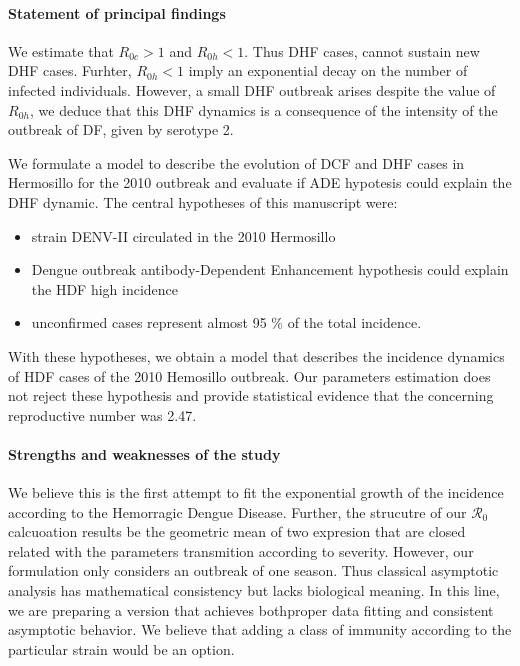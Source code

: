 \paragraph{Statement of principal findings}
    We estimate that $R_{0c}>1$ and  $R_{0h}<1$. Thus DHF cases, 
cannot sustain new DHF cases. Furhter, $R_{0h}<1$ imply an
exponential decay on the number of infected individuals. However,
a small DHF outbreak arises despite the value of $R_{0h}$, we deduce
that this DHF dynamics is a consequence of the
intensity of the outbreak of DF, given by serotype 2.

    We formulate a  model to describe the evolution of DCF and DHF
cases in Hermosillo for the 2010 outbreak and evaluate if ADE
hypotesis could explain the DHF dynamic. 
The central hypotheses of this manuscript were:
    \begin{itemize}
        \item
            strain DENV-II circulated in the 2010 Hermosillo 
        \item
            Dengue outbreak antibody-Dependent Enhancement hypothesis
            could explain the HDF high incidence 
        \item
            unconfirmed cases represent almost 95 \% of the total
            incidence.
    \end{itemize}
    With these hypotheses, we obtain a model that describes
the incidence dynamics of HDF cases of the 2010 Hemosillo outbreak.
Our parameters estimation does not reject these hypothesis and provide
statistical evidence that the concerning reproductive number was \num{2.47}.

\paragraph{Strengths and weaknesses of the study}
    We believe this is the first attempt to fit the exponential 
growth of the incidence according to the Hemorragic Dengue Disease. 
Further, the strucutre of our $\mathcal{R}_0$ calcuoation results be 
the geometric mean of two expresion that are closed related 
with the parameters transmition according to severity.  
However, our formulation only considers an outbreak of one season.
Thus classical asymptotic analysis has mathematical consistency
but lacks biological meaning.  In this line, we are preparing a
version that achieves both\textemdash proper data fitting and consistent
asymptotic behavior. We believe that adding a class of immunity
according to the particular strain would be an option.

